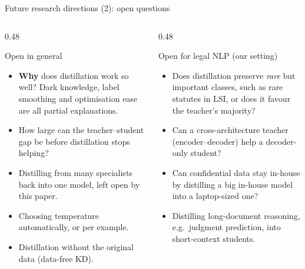 \documentclass[aspectratio=169,11pt]{beamer}
\begin{document}
\begin{frame}{Future research directions (2): open questions}
  \begin{columns}[T]
    \begin{column}{0.48\textwidth}
      \begin{block}{Open in general}
        \small
        \begin{itemize}
          \item \textbf{Why} does distillation work so well? Dark knowledge, label smoothing and optimisation ease are all partial explanations.
          \item How large can the teacher--student gap be before distillation stops helping?
          \item Distilling from many specialists back into one model, left open by this paper.
          \item Choosing temperature automatically, or per example.
          \item Distillation without the original data (data-free KD).
        \end{itemize}
      \end{block}
    \end{column}
    \begin{column}{0.48\textwidth}
      \begin{exampleblock}{Open for legal NLP (our setting)}
        \small
        \begin{itemize}
          \item Does distillation preserve \emph{rare} but important classes, such as rare statutes in LSI, or does it favour the teacher's majority?
          \item Can a cross-architecture teacher (encoder--decoder) help a decoder-only student?
          \item Can confidential data stay in-house by distilling a big in-house model into a laptop-sized one?
          \item Distilling long-document reasoning, e.g.\ judgment prediction, into short-context students.
        \end{itemize}
      \end{exampleblock}
    \end{column}
  \end{columns}
\end{frame}
\end{document}
